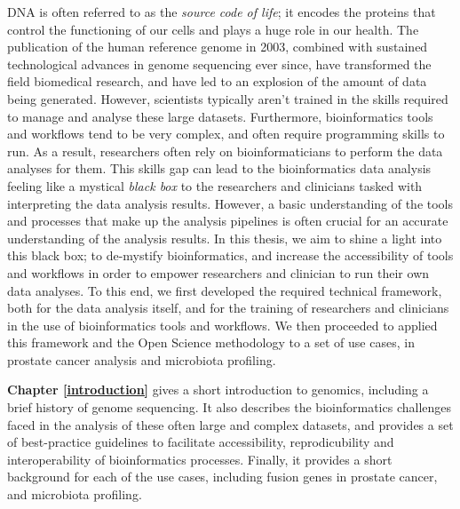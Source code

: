 DNA is often referred to as the \emph{source code of life}; it encodes the proteins that control the functioning of our cells and plays a huge role in our health. The publication of the human reference genome in 2003, combined with sustained technological advances in genome sequencing ever since, have transformed the field biomedical research, and have led to an explosion of the amount of data being generated.
However, scientists typically aren't trained in the skills required to manage and analyse these large datasets. Furthermore, bioinformatics tools and workflows tend to be very complex, and often require programming skills to run. As a result, researchers often rely on bioinformaticians to perform the data analyses for them.
This skills gap can lead to the bioinformatics data analysis feeling like a mystical \textit{black box} to the researchers and clinicians tasked with interpreting the data analysis results.
However, a basic understanding of the tools and processes that make up the analysis pipelines is often crucial for an accurate understanding of the analysis results. In this thesis, we aim to shine a light into this black box; to de-mystify bioinformatics, and increase the accessibility of tools and workflows in order to empower researchers and clinician to run their own data analyses.
To this end, we first developed the required technical framework, both for the data analysis itself, and for the training of researchers and clinicians in the use of bioinformatics tools and workflows. We then proceeded to applied this framework and the Open Science methodology to a set of use cases, in prostate cancer analysis and microbiota profiling.

\textbf{Chapter \ref{introduction}} gives a short introduction to genomics, including a brief history of genome sequencing. It also describes the bioinformatics challenges faced in the analysis of these often large and complex datasets, and provides a set of best-practice guidelines to facilitate accessibility, reprodicubility and interoperability of bioinformatics processes. Finally, it provides a short background for each of the use cases, including fusion genes in prostate cancer, and microbiota profiling.

